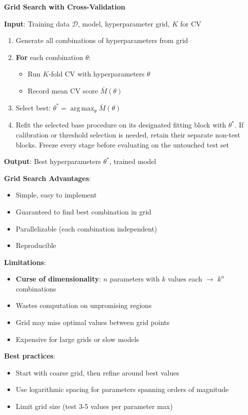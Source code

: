 \documentclass[11pt,twoside]{article}
\numberwithin{equation}{section}
\DeclareMathOperator*{\argmax}{arg\,max}
\theoremstyle{plain}
\theoremstyle{definition}
\theoremstyle{remark}
\newenvironment{keyidea}{
  \begin{tcolorbox}[colback=yellow!5!white,
                    colframe=yellow!50!black,
                    title=Key Idea,
                    breakable,
                    enhanced,
                    sharp corners,
                    boxrule=0.8pt,
                    left=6pt, right=6pt, top=6pt, bottom=6pt]
}{
  \end{tcolorbox}
}
\begin{document}
\begin{algorithmbox}
\textbf{Grid Search with Cross-Validation}

\textbf{Input}: Training data $\mathcal{D}$, model, hyperparameter grid, $K$ for CV

\begin{enumerate}
\item Generate all combinations of hyperparameters from grid

\item \textbf{For} each combination $\theta$:
\begin{itemize}
\item Run $K$-fold CV with hyperparameters $\theta$
\item Record mean CV score $\bar{M}(\theta)$
\end{itemize}

\item Select best: $\theta^* = \argmax_\theta \bar{M}(\theta)$

\item Refit the selected base procedure on its designated fitting block with $\theta^*$. If calibration or threshold selection is needed, retain their separate non-test blocks. Freeze every stage before evaluating on the untouched test set
\end{enumerate}

\textbf{Output}: Best hyperparameters $\theta^*$, trained model
\end{algorithmbox}

\begin{keyidea}
\textbf{Grid Search Advantages}:
\begin{itemize}
\item Simple, easy to implement
\item Guaranteed to find best combination in grid
\item Parallelizable (each combination independent)
\item Reproducible
\end{itemize}

\textbf{Limitations}:
\begin{itemize}
\item \textbf{Curse of dimensionality}: $n$ parameters with $k$ values each $\to$ $k^n$ combinations
\item Wastes computation on unpromising regions
\item Grid may miss optimal values between grid points
\item Expensive for large grids or slow models
\end{itemize}

\textbf{Best practices}:
\begin{itemize}
\item Start with coarse grid, then refine around best values
\item Use logarithmic spacing for parameters spanning orders of magnitude
\item Limit grid size (test 3-5 values per parameter max)
\end{itemize}
\end{keyidea}
\end{document}
